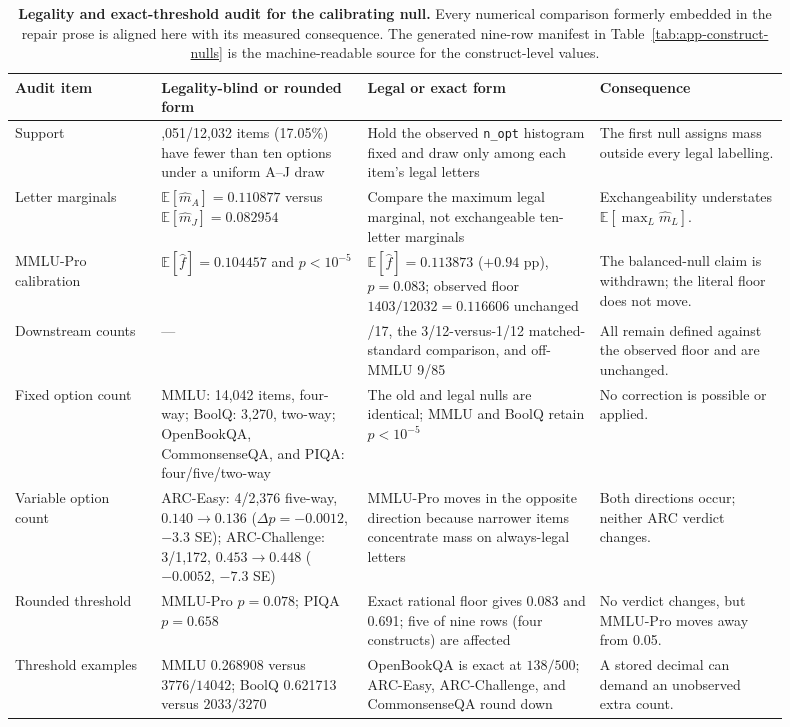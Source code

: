 \begin{table}[!htbp]
\centering
\small
\setlength{\tabcolsep}{3.0pt}
\begin{tabular}{>{\raggedright\arraybackslash}p{0.17\linewidth}>{\raggedright\arraybackslash}p{0.24\linewidth}>{\raggedright\arraybackslash}p{0.27\linewidth}>{\raggedright\arraybackslash}p{0.22\linewidth}}
\toprule
Audit item & Legality-blind or rounded form & Legal or exact form & Consequence \\
\midrule
Support & 2,051/12,032 items (17.05\%) have fewer than ten options under a uniform A--J draw & Hold the observed \texttt{n\_opt} histogram fixed and draw only among each item's legal letters & The first null assigns mass outside every legal labelling. \\
Letter marginals & $\mathbb{E}[\hat m_A]=0.110877$ versus $\mathbb{E}[\hat m_J]=0.082954$ & Compare the maximum legal marginal, not exchangeable ten-letter marginals & Exchangeability understates $\mathbb{E}[\max_L\hat m_L]$. \\
MMLU-Pro calibration & $\mathbb{E}[\hat f]=0.104457$ and $p<10^{-5}$ & $\mathbb{E}[\hat f]=0.113873$ ($+0.94$ pp), $p=0.083$; observed floor $1403/12032=0.116606$ unchanged & The balanced-null claim is withdrawn; the literal floor does not move. \\
Downstream counts & --- & 15/17, the 3/12-versus-1/12 matched-standard comparison, and off-MMLU 9/85 & All remain defined against the observed floor and are unchanged. \\
Fixed option count & MMLU: 14,042 items, four-way; BoolQ: 3,270, two-way; OpenBookQA, CommonsenseQA, and PIQA: four/five/two-way & The old and legal nulls are identical; MMLU and BoolQ retain $p<10^{-5}$ & No correction is possible or applied. \\
Variable option count & ARC-Easy: 4/2,376 five-way, $0.140\to0.136$ ($\Delta p=-0.0012$, $-3.3$ SE); ARC-Challenge: 3/1,172, $0.453\to0.448$ ($-0.0052$, $-7.3$ SE) & MMLU-Pro moves in the opposite direction because narrower items concentrate mass on always-legal letters & Both directions occur; neither ARC verdict changes. \\
Rounded threshold & MMLU-Pro $p=0.078$; PIQA $p=0.658$ & Exact rational floor gives 0.083 and 0.691; five of nine rows (four constructs) are affected & No verdict changes, but MMLU-Pro moves away from 0.05. \\
Threshold examples & MMLU 0.268908 versus $3776/14042$; BoolQ 0.621713 versus $2033/3270$ & OpenBookQA is exact at $138/500$; ARC-Easy, ARC-Challenge, and CommonsenseQA round down & A stored decimal can demand an unobserved extra count. \\
\bottomrule
\end{tabular}
\caption{\textbf{Legality and exact-threshold audit for the calibrating null.} Every numerical comparison formerly embedded in the repair prose is aligned here with its measured consequence. The generated nine-row manifest in Table~\ref{tab:app-construct-nulls} is the machine-readable source for the construct-level values.}
\label{tab:null-repair-audit}
\end{table}
